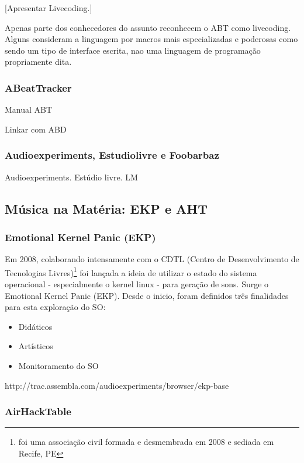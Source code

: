   [Apresentar Livecoding.]

  Apenas parte dos conhecedores do assunto reconhecem
  o ABT como livecoding. Alguns
  consideram a linguagem por macros mais especializadas e poderosas como
  sendo um tipo de interface escrita, nao uma linguagem de programação
  propriamente dita.

      \subsubsection{ABeatTracker}


  Manual ABT

  Linkar com ABD

      \subsubsection{Audioexperiments, Estudiolivre e Foobarbaz}

      Audioexperiments. Estúdio livre. LM





  \subsection{Música na Matéria: EKP e AHT}
      \subsubsection{Emotional Kernel Panic (EKP)}

Em 2008, colaborando intensamente com o CDTL
(Centro de Desenvolvimento de Tecnologias Livres)\footnote{foi uma associação civil formada e desmembrada em 2008 e sediada em Recife, PE}
foi lançada a ideia de utilizar o estado do sistema operacional - especialmente o kernel linux - para
geração de sons. Surge o Emotional Kernel Panic (EKP). Desde o inicio, foram definidos três finalidades
para esta exploração do SO:

\begin{itemize}
    \item Didáticos
    \item Artísticos
    \item Monitoramento do SO
\end{itemize}

http://trac.assembla.com/audioexperiments/browser/ekp-base


      \subsubsection{AirHackTable}



